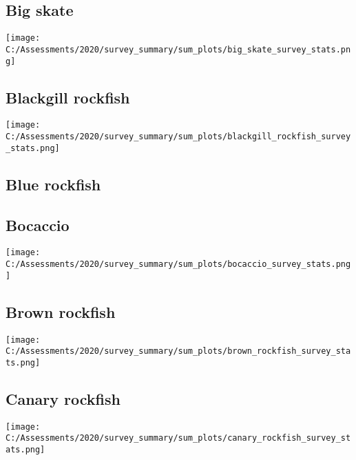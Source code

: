 \documentclass[12pt,]{article}
\begin{document}
\hypertarget{big-skate}{%
\subsection{Big skate}\label{big-skate}}

\texttt{[image: C:/Assessments/2020/survey\_summary/sum\_plots/big\_skate\_survey\_stats.png]}
\FloatBarrier  

\hypertarget{blackgill-rockfish}{%
\subsection{Blackgill rockfish}\label{blackgill-rockfish}}

\texttt{[image: C:/Assessments/2020/survey\_summary/sum\_plots/blackgill\_rockfish\_survey\_stats.png]}
\FloatBarrier  

\hypertarget{blue-rockfish}{%
\subsection{Blue rockfish}\label{blue-rockfish}}

\FloatBarrier

\hypertarget{bocaccio}{%
\subsection{Bocaccio}\label{bocaccio}}

\texttt{[image: C:/Assessments/2020/survey\_summary/sum\_plots/bocaccio\_survey\_stats.png]}
\FloatBarrier  

\hypertarget{brown-rockfish}{%
\subsection{Brown rockfish}\label{brown-rockfish}}

\texttt{[image: C:/Assessments/2020/survey\_summary/sum\_plots/brown\_rockfish\_survey\_stats.png]}
\FloatBarrier  

\hypertarget{canary-rockfish}{%
\subsection{Canary rockfish}\label{canary-rockfish}}

\texttt{[image: C:/Assessments/2020/survey\_summary/sum\_plots/canary\_rockfish\_survey\_stats.png]}
\FloatBarrier  
\end{document}
